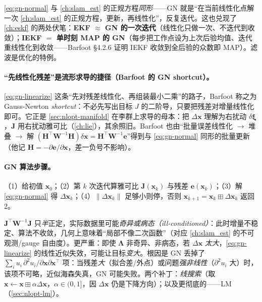 \begin{insight}
\cref{eq:gn-normal} 与 \cref{ch:slam_est} 的正规方程\emph{同形}——GN 就是“在当前线性化点解一次 \cref{ch:slam_est} 的正规方程，更新，再线性化”，反复迭代。这也兑现了 \cref{ch:eskf} 的两处伏笔：\textbf{EKF $\approx$ GN 的一次迭代}（线性化只做一次、不迭代到收敛）；\textbf{IEKF $=$ 单时刻 MAP 的 GN}（每步把工作点设为上次后验均值、迭代重线性化到收敛——Barfoot\cite{barfoot2024state} §4.2.6 证明 IEKF 收敛到全后验的众数即 MAP）。滤波是优化的特例。
\end{insight}

\paragraph{“先线性化残差”是流形求导的捷径（Barfoot 的 GN shortcut）。}
\cref{eq:gn-linearize} 这条“先对残差线性化、再组装最小二乘”的路子，Barfoot\cite{barfoot2024state} 称之为 Gauss-Newton \emph{shortcut}：不必先写出目标 $J$ 的二阶导，只要把残差对增量线性化即可。它正是 \cref{sec:nlopt-manifold} 在李群上求导的母本：把 $\Delta\mathbf{x}$ 理解为右扰动 $\delta\boldsymbol{\xi}$，$\mathbf{J}$ 用右扰动雅可比（\cref{ch:lie}），其余照旧。Barfoot 也由“批量误差线性化 $\to$ 堆叠 $\to$ 解 $(\mathbf{H}^\top\mathbf{W}^{-1}\mathbf{H})\delta\mathbf{x}=\mathbf{H}^\top\mathbf{W}^{-1}\mathbf{e}$”得到与 \cref{eq:gn-normal} 同形的批量更新（他记 $\mathbf{H}=-\partial\mathbf{e}/\partial\mathbf{x}$，差一负号不影响）。

\paragraph{GN 算法步骤。}\cite{gaoxiang2019slam14}
（1）给初值 $\mathbf{x}_0$；（2）第 $k$ 次迭代算雅可比 $\mathbf{J}(\mathbf{x}_k)$ 与残差 $\mathbf{e}(\mathbf{x}_k)$；（3）解 \cref{eq:gn-normal} 得 $\Delta\mathbf{x}_k$；（4）$\|\Delta\mathbf{x}_k\|$ 足够小则停，否则 $\mathbf{x}_{k+1}=\mathbf{x}_k\boxplus\Delta\mathbf{x}_k$ 返回 2。

\begin{pitfall}
$\mathbf{J}^\top\mathbf{W}^{-1}\mathbf{J}$ 只\emph{半}正定，实际数据里可能\emph{奇异或病态（ill-conditioned）}\cite{gaoxiang2019slam14}：此时增量不稳定、算法不收敛，几何上意味着“局部不像二次函数”（对应 \cref{ch:slam_est} 的不可观测/gauge 自由度）。更严重：即使 $\boldsymbol{\Lambda}$ 非奇异、非病态，若 $\Delta\mathbf{x}$ \emph{太大}，\cref{eq:gn-linearize} 的线性近似失效，可能让目标\emph{变大}\cite{gaoxiang2019slam14,barfoot2024state}。根因是 GN 丢掉了 $\sum_i u_i\,\partial^2u_i/\partial\mathbf{x}\partial\mathbf{x}^\top$ 项：当残差\emph{大}（拟合差/外点）或问题\emph{强非线性}（$\partial^2u_i$ 大）时，该项不可略，近似海森失真，GN 可能失败。两个补丁：\emph{线搜索}（取 $\mathbf{x}\leftarrow\mathbf{x}\boxplus\alpha\Delta\mathbf{x}$，$\alpha\in(0,1]$，因 $\Delta\mathbf{x}$ 仍是下降方向）；以及更彻底的——LM（\cref{sec:nlopt-lm}）。
\end{pitfall}

